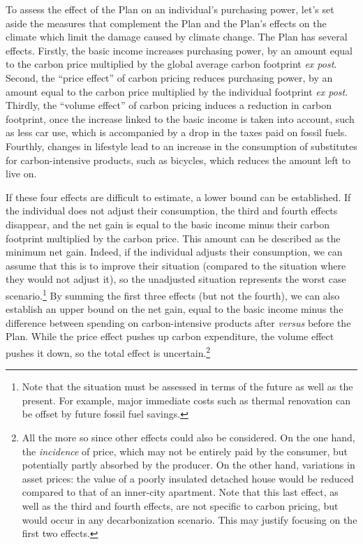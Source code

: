 \documentclass[a5paper,english,openany]{memoir}
\begin{document}
To assess the effect of the Plan on an individual's purchasing power, let's set aside the measures that complement the Plan and the Plan's effects on the climate which limit the damage caused by climate change. %
The Plan has several effects. Firstly, the basic income increases purchasing power, by an amount equal to the carbon price multiplied by the global average carbon footprint \textit{ex post}. Second, the ``price effect'' of carbon pricing reduces purchasing power, by an amount equal to the carbon price multiplied by the individual footprint \textit{ex post}. Thirdly, the ``volume effect'' of carbon pricing induces a reduction in carbon footprint, once the increase linked to the basic income is taken into account, %
such as less car use, which is accompanied by a drop in the taxes paid on fossil fuels. Fourthly, changes in lifestyle lead to an increase in the consumption of substitutes for carbon-intensive products, such as bicycles, which reduces the amount left to live on. %

If these four effects are difficult to estimate, a lower bound can be established. If the individual does not adjust their %
consumption, the third and fourth effects disappear, and the net gain is equal to the basic income minus their %
carbon footprint multiplied by the carbon price. This amount can be described as the minimum net gain. Indeed, if the individual adjusts their %
consumption, we can assume that this is to improve their %
situation (compared to the situation where they %
would not adjust it), so the unadjusted situation represents the worst case scenario.\footnote{Note that the situation must be assessed in terms of the future as well as the present. For example, major immediate costs such as thermal renovation can be offset by future fossil fuel savings.} By summing the first three effects (but not the fourth), we can also establish an upper bound on the net gain, equal to the basic income minus the difference between spending on carbon-intensive products after \textit{versus} before the Plan. 
While the price effect pushes up carbon expenditure, the volume effect pushes it down, so the total effect is uncertain.\footnote{All the more so since other effects could also be considered. On the one hand, the \textit{incidence} of price, which may not be entirely paid by the consumer, but potentially partly absorbed by the producer. On the other hand, variations in asset prices: the value of a poorly insulated detached house would be reduced compared to that of an inner-city apartment. Note that this last effect, as well as the third and fourth effects, are not specific to carbon pricing, but would occur in any decarbonization scenario. This may justify focusing on the first two effects.} 
\end{document}
